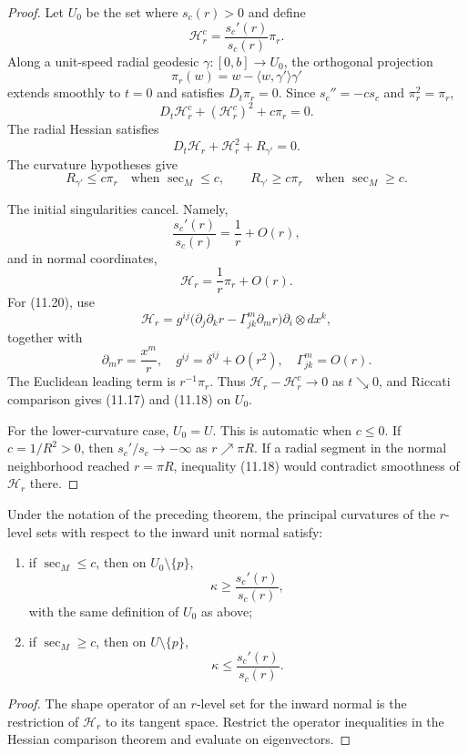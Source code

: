 \begin{proof}
\sketch Let $U_0$ be the set where $s_c(r)>0$ and define
\[
\mathcal H_r^c=\frac{s_c'(r)}{s_c(r)}\pi_r.
\]
Along a unit-speed radial geodesic $\gamma\colon[0,b]\to U_0$, the orthogonal
projection
\[
\pi_r(w)=w-\langle w,\gamma'\rangle\gamma'
\]
extends smoothly to $t=0$ and satisfies $D_t\pi_r=0$. Since
$s_c''=-cs_c$ and $\pi_r^2=\pi_r$,
\[
D_t\mathcal H_r^c+(\mathcal H_r^c)^2+c\pi_r=0.
\]
The radial Hessian satisfies
\[
D_t\mathcal H_r+\mathcal H_r^2+R_{\gamma'}=0.
\]
The curvature hypotheses give
\[
R_{\gamma'}\leq c\pi_r\quad\text{when }\sec_M\leq c,
\qquad
R_{\gamma'}\geq c\pi_r\quad\text{when }\sec_M\geq c.
\]

The initial singularities cancel. Namely,
\begin{equation}
\frac{s_c'(r)}{s_c(r)}=\frac1r+O(r), \tag{11.19}
\end{equation}
and in normal coordinates,
\begin{equation}
\mathcal H_r=\frac1r\pi_r+O(r). \tag{11.20}
\end{equation}
For (11.20), use
\[
\mathcal H_r
=g^{ij}\bigl(\partial_j\partial_kr
-\Gamma_{jk}^m\partial_mr\bigr)\partial_i\otimes dx^k,
\]
together with
\[
\partial_mr=\frac{x^m}{r},
\quad g^{ij}=\delta^{ij}+O(r^2),
\quad \Gamma_{jk}^m=O(r).
\]
The Euclidean leading term is $r^{-1}\pi_r$. Thus
$\mathcal H_r-\mathcal H_r^c\to0$ as $t\searrow0$, and Riccati comparison gives
(11.17) and (11.18) on $U_0$.

For the lower-curvature case, $U_0=U$. This is automatic when $c\leq0$. If
$c=1/R^2>0$, then $s_c'/s_c\to-\infty$ as $r\nearrow\pi R$. If a radial
segment in the normal neighborhood reached $r=\pi R$, inequality (11.18)
would contradict smoothness of $\mathcal H_r$ there.
\end{proof}

\begin{corollary}
\label{cor:principal-curvature-comparison}
Under the notation of the preceding theorem, the principal curvatures of the
$r$-level sets with respect to the inward unit normal satisfy:
\begin{enumerate}
\item[(a)] if $\sec_M\leq c$, then on $U_0\setminus\{p\}$,
\[
\kappa\geq\frac{s_c'(r)}{s_c(r)},
\]
with the same definition of $U_0$ as above;
\item[(b)] if $\sec_M\geq c$, then on $U\setminus\{p\}$,
\[
\kappa\leq\frac{s_c'(r)}{s_c(r)}.
\]
\end{enumerate}

\begin{proof}
\sketch The shape operator of an $r$-level set for the inward normal is the
restriction of $\mathcal H_r$ to its tangent space. Restrict the operator
inequalities in the Hessian comparison theorem and evaluate on eigenvectors.
\end{proof}
\end{corollary}

